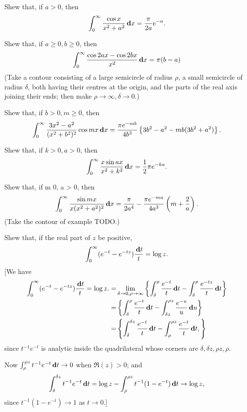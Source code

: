 \begin{wandwexample}
  Shew that, if $a > 0$, then
  $$
  \int_{0}^{\infty}
  \frac{ \cos x}{x^{2} + a^{2}} \, \mathbf{d} x
  =
  \frac{\pi}{2a} e^{-a}.
  $$
\end{wandwexample}
\begin{wandwexample}
  Shew that, if $a \geq 0, b \geq 0$, then
  $$
  \int_{0}^{\infty}
  \frac{ \cos 2ax - \cos 2bx}{x^{2}}
  \, \mathbf{d} x
  =
  \pi (b-a)
  $$
  (Take a contour consisting of a large semicircle of radius $\rho$, a
  small semicircle of radius $\delta$, both having their centres at the
  origin, and the parts of the real axis joining their ends; then
  make $\rho \rightarrow \infty, \delta \rightarrow 0$.)
\end{wandwexample}
\begin{wandwexample}
  Shew that, if $b > 0, m \geq 0$, then
  $$
  \int_{0}^{\infty}
  \frac{3x^{2} - a^{2}}{ (x^{2} + b^{2})^{2} }
  \cos mx
  \, \mathbf{d} x
  =
  \frac{\pi e^{-mb}}{4b^{3}}
  \left\{ 
    3b^{2} - a^{2} - mb(3b^{2}+a^{2})
   \right\}.
  $$
\end{wandwexample}
\begin{wandwexample}
  Shew that, if $k > 0, a > 0$, then
  $$
  \int_{0}^{\infty}
  \frac{ x \sin ax }{x^{2} + k^{2}}
  \, \mathbf{d} x
  =
  \frac{1}{2} \pi e^{-ka}.
  $$
\end{wandwexample}
\begin{wandwexample}
  Shew that, if m 0, a > 0, then
  $$
  \int_{0}^{\infty}
  \frac{ \sin mx }{ x (x^{2} + a^{2})^{2} }
  \, \mathbf{d} x
  =
  \frac{\pi}{2a^{4}}
  -
  \frac{\pi e^{-ma}}{4a^{3}}
  \left(  m + \frac{2}{a}  \right).
  $$
  (Take the contour of example TODO.)
\end{wandwexample}
\begin{wandwexample}
Shew that, if the real part of $z$ be positive,
$$
\int_{0}^{\infty} (e^{-t} - e^{-tz}) \frac{\, \mathbf{d} t}{t} = \log z.
$$
[We have
\begin{align*}
  \int_{0}^{\infty} (e^{-t} - e^{-tz}) \frac{\, \mathbf{d} t}{t} = \log z.
  =&
  \lim_{\delta\rightarrow 0, \rho\rightarrow\infty}
  \left\{ 
    \int_{\delta}^{\rho} \frac{e^{-t}}{t} \, \mathbf{d} t
    -
    \int_{\delta}^{\rho} \frac{e^{-tz}}{t} \, \mathbf{d} t
   \right\}
  \\
  =&
    \left\{ 
    \int_{\delta}^{\rho} \frac{e^{-t}}{t} \, \mathbf{d} t
    -
    \int_{\delta z}^{\rho z} \frac{e^{-u}}{u} \, \mathbf{d} u
   \right\}
  \\
  =&
    \left\{ 
    \int_{\delta}^{\delta z} \frac{e^{-t}}{t} \, \mathbf{d} t
    -
    \int_{\rho}^{\rho z} \frac{e^{-t}}{t} \, \mathbf{d} t,
   \right\}
\end{align*}
since $t^{-1} e^{-t}$ is analytic inside the
quadrilateral whose corners are $\delta, \delta z, \rho z, \rho$.

%
%

Now $\int_{\rho}^{\rho z} t^{-1} e^{-t} \, \mathbf{d} t \rightarrow 0$
when $\Re(z) > 0$; and
$$
\int_{\delta}^{\delta z} t^{-1} e^{-t} \, \mathbf{d} t
= \log z
-
\int_{\rho}^{\rho z} t^{-1} (1 - e^{-t}) \, \mathbf{d} t
\rightarrow
\log z,
$$
since $t^{-1} (1 - e^{-t}) \rightarrow 1$ as $t \rightarrow 0$.]
\end{wandwexample}
